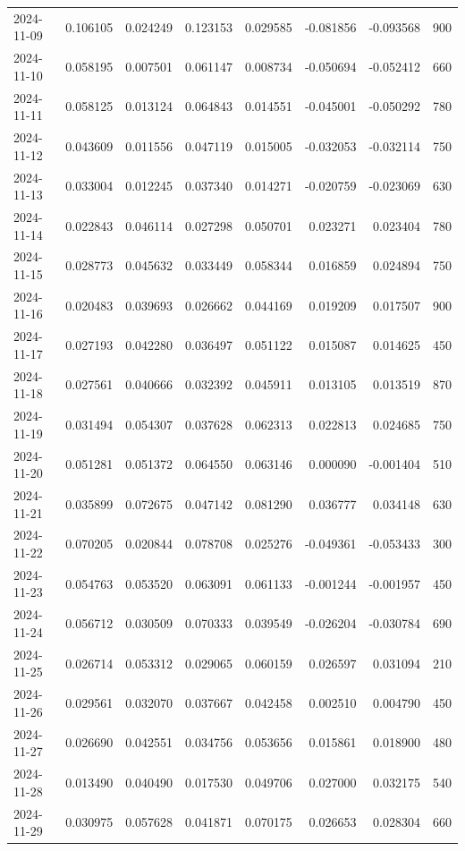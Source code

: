 \begin{tabular}{lrrrrrrr}
2024-11-09 & 0.106105 & 0.024249 & 0.123153 & 0.029585 & -0.081856 & -0.093568 & 900 \\
2024-11-10 & 0.058195 & 0.007501 & 0.061147 & 0.008734 & -0.050694 & -0.052412 & 660 \\
2024-11-11 & 0.058125 & 0.013124 & 0.064843 & 0.014551 & -0.045001 & -0.050292 & 780 \\
2024-11-12 & 0.043609 & 0.011556 & 0.047119 & 0.015005 & -0.032053 & -0.032114 & 750 \\
2024-11-13 & 0.033004 & 0.012245 & 0.037340 & 0.014271 & -0.020759 & -0.023069 & 630 \\
2024-11-14 & 0.022843 & 0.046114 & 0.027298 & 0.050701 & 0.023271 & 0.023404 & 780 \\
2024-11-15 & 0.028773 & 0.045632 & 0.033449 & 0.058344 & 0.016859 & 0.024894 & 750 \\
2024-11-16 & 0.020483 & 0.039693 & 0.026662 & 0.044169 & 0.019209 & 0.017507 & 900 \\
2024-11-17 & 0.027193 & 0.042280 & 0.036497 & 0.051122 & 0.015087 & 0.014625 & 450 \\
2024-11-18 & 0.027561 & 0.040666 & 0.032392 & 0.045911 & 0.013105 & 0.013519 & 870 \\
2024-11-19 & 0.031494 & 0.054307 & 0.037628 & 0.062313 & 0.022813 & 0.024685 & 750 \\
2024-11-20 & 0.051281 & 0.051372 & 0.064550 & 0.063146 & 0.000090 & -0.001404 & 510 \\
2024-11-21 & 0.035899 & 0.072675 & 0.047142 & 0.081290 & 0.036777 & 0.034148 & 630 \\
2024-11-22 & 0.070205 & 0.020844 & 0.078708 & 0.025276 & -0.049361 & -0.053433 & 300 \\
2024-11-23 & 0.054763 & 0.053520 & 0.063091 & 0.061133 & -0.001244 & -0.001957 & 450 \\
2024-11-24 & 0.056712 & 0.030509 & 0.070333 & 0.039549 & -0.026204 & -0.030784 & 690 \\
2024-11-25 & 0.026714 & 0.053312 & 0.029065 & 0.060159 & 0.026597 & 0.031094 & 210 \\
2024-11-26 & 0.029561 & 0.032070 & 0.037667 & 0.042458 & 0.002510 & 0.004790 & 450 \\
2024-11-27 & 0.026690 & 0.042551 & 0.034756 & 0.053656 & 0.015861 & 0.018900 & 480 \\
2024-11-28 & 0.013490 & 0.040490 & 0.017530 & 0.049706 & 0.027000 & 0.032175 & 540 \\
2024-11-29 & 0.030975 & 0.057628 & 0.041871 & 0.070175 & 0.026653 & 0.028304 & 660 \\

\end{tabular}
